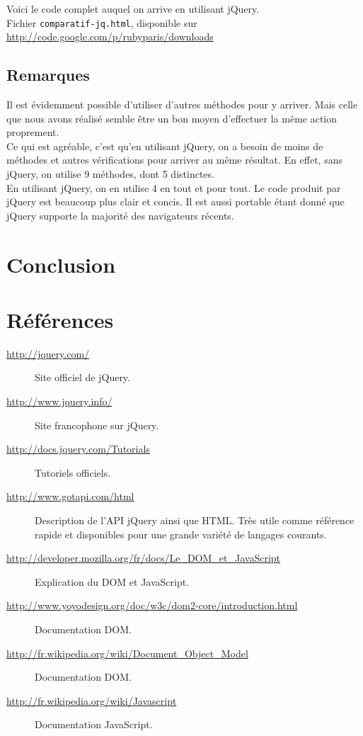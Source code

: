 \documentclass[10pt,a4paper,titlepage]{article}
\begin{document}
Voici le code complet auquel on arrive en utilisant jQuery. \\

Fichier \texttt{comparatif-jq.html}, disponible sur \url{http://code.google.com/p/rubyparis/downloads}



\subsection{Remarques}

Il est évidemment possible d'utiliser d'autres méthodes pour y arriver. Mais celle que nous avons réalisé semble être un bon moyen d'effectuer la même action proprement.  \\

Ce qui est agréable, c'est qu'en utilisant jQuery, on a besoin de moins de méthodes et autres vérifications pour arriver au même résultat. En effet, sans jQuery, on utilise 9 méthodes, dont 5 distinctes. \\

En utilisant jQuery, on en utilise 4 en tout et pour tout. Le code produit par jQuery est beaucoup plus clair et concis. Il est aussi portable étant donné que jQuery supporte la majorité des navigateurs récents.

\newpage
\section{Conclusion}

\newpage
\section{Références}
\small
\begin{description}
	\item[\url{http://jquery.com/}] {Site officiel de jQuery.}
	\item[\url{http://www.jquery.info/}] {Site francophone sur jQuery.}
	\item[\url{http://docs.jquery.com/Tutorials}] {Tutoriels officiels.}
	\item[\url{http://www.gotapi.com/html}] {Description de l'API jQuery ainsi que HTML. Très utile comme référence rapide et disponibles pour une grande variété de langages courants.}
	\item[\url{http://developer.mozilla.org/fr/docs/Le_DOM_et_JavaScript}] {Explication du DOM et JavaScript.}
	\item[\url{http://www.yoyodesign.org/doc/w3c/dom2-core/introduction.html}] {Documentation DOM.}
	\item[\url{http://fr.wikipedia.org/wiki/Document_Object_Model}] {Documentation DOM.}
	\item[\url{http://fr.wikipedia.org/wiki/Javascript}] {Documentation JavaScript.}
\end{description}
\end{document}
